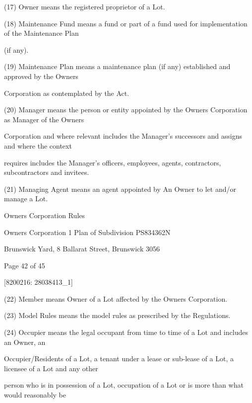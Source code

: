 \documentclass{article}
\begin{document}
{\fontsize{9.962}{1}(17) Owner means the registered proprietor of a Lot. }

{\fontsize{9.962}{1}(18) Maintenance Fund means a fund or part of a fund used for implementation of the Maintenance Plan }

{\fontsize{10.02}{1}(if any).  }

{\fontsize{9.962}{1}(19) Maintenance Plan means a maintenance plan (if any) established and approved by the Owners }

{\fontsize{10.02}{1}Corporation as contemplated by the Act.  }

{\fontsize{9.962}{1}(20) Manager means the person or entity appointed by the Owners Corporation as Manager of the Owners }

{\fontsize{10.02}{1}Corporation and where relevant includes the Manager’s successors and assigns and where the context }

{\fontsize{10.02}{1}requires includes the Manager’s officers, employees, agents, contractors, subcontractors and invitees. }

{\fontsize{9.962}{1}(21) Managing Agent means an agent appointed by An Owner to let and/or manage a Lot. }

\newpage





{\fontsize{9}{1}Owners Corporation Rules }

{\fontsize{9}{1}Owners Corporation 1 Plan of Subdivision PS834362N }

{\fontsize{9}{1}Brunswick Yard, 8 Ballarat Street, Brunswick 3056 }


{\fontsize{9}{1}Page 42  of 45 }



{\fontsize{7.02}{1}[8200216: 28038413\_1] }

{\fontsize{9.962}{1}(22) Member means Owner of a Lot affected by the Owners Corporation. }

{\fontsize{9.962}{1}(23) Model Rules means the model rules as prescribed by the Regulations. }

{\fontsize{9.962}{1}(24) Occupier means the legal occupant from time to time of a Lot and includes an Owner, an }

{\fontsize{10.02}{1}Occupier/Residents of a Lot, a tenant under a lease or sub-lease of a Lot, a licensee of a Lot and any other }

{\fontsize{10.02}{1}person who is in possession of a Lot, occupation of a Lot or is more than what would reasonably be }
\end{document}
